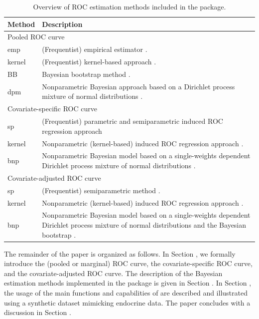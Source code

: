 \begin{table}[t!]
	\centering
	\begin{tabular}{p{3cm}p{10cm}}
		\hline
		Method & Description \\ \hline
		\multicolumn{2}{l}{Pooled ROC curve} \\ \hline
		emp & (Frequentist) empirical estimator \citep{Hsieh1996}.\\
		kernel & (Frequentist) kernel-based approach \citep{Zou97}.\\
		BB &  Bayesian bootstrap method \citep{Gu2008}. \\
		dpm &  Nonparametric Bayesian approach based on a Dirichlet process mixture of normal distributions \citep{Erkanli2006}.\\ \hline
		\multicolumn{2}{l}{Covariate-specific ROC curve} \\ \hline
		sp & (Frequentist) parametric and semiparametric induced ROC regression approach \citep{Pepe98,Faraggi03}\\
		kernel & Nonparametric (kernel-based) induced ROC regression approach \citep{MX11a}.\\
		bnp & Nonparametric Bayesian model based on a single-weights dependent Dirichlet process mixture of normal distributions \citep{Inacio13}.\\ \hline
		\multicolumn{2}{l}{Covariate-adjusted ROC curve} \\ \hline
		sp & (Frequentist) semiparametric method \citep{Janes09a}.\\
		kernel &  Nonparametric (kernel-based) induced ROC regression approach \citep{MX11a}.\\
		bnp & Nonparametric Bayesian model based on a single-weights dependent Dirichlet process mixture of normal distributions and the Bayesian bootstrap \citep{Inacio18}. \\ \hline
	\end{tabular}
	\caption{\label{tab:overview} Overview of ROC estimation methods included in the  package.}
\end{table}

The remainder of the paper is organized as follows. In Section , we formally introduce the (pooled or marginal) ROC curve, the covariate-specific ROC curve, and the covariate-adjusted ROC curve. The description of the Bayesian estimation methods implemented in the  package is given in Section . In Section , the usage of the main functions and capabilities of  are described and illustrated using a synthetic dataset mimicking endocrine data. The paper concludes with a discussion in Section .

